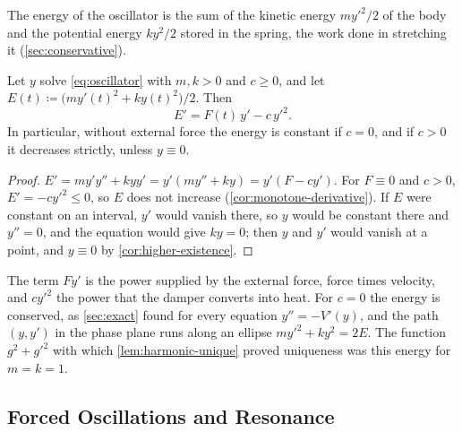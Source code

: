 The energy of the oscillator is the sum of the kinetic energy $my'^2/2$ of the body and the potential energy $ky^2/2$ stored in the spring, the work done in stretching it (\cref{sec:conservative}).

\begin{proposition}
\label{prop:oscillator-energy}
Let $y$ solve \eqref{eq:oscillator} with $m,k>0$ and $c\ge0$, and let $E(t)\coloneqq\bigl(my'(t)^2+ky(t)^2\bigr)/2$. Then
\[
E'=F(t)\,y'-c\,y'^2 .
\]
In particular, without external force the energy is constant if $c=0$, and if $c>0$ it decreases strictly, unless $y\equiv0$.
\end{proposition}

\begin{proof}
$E'=my'y''+kyy'=y'(my''+ky)=y'(F-cy')$. For $F\equiv0$ and $c>0$, $E'=-cy'^2\le0$, so $E$ does not increase (\cref{cor:monotone-derivative}). If $E$ were constant on an interval, $y'$ would vanish there, so $y$ would be constant there and $y''=0$, and the equation would give $ky=0$; then $y$ and $y'$ would vanish at a point, and $y\equiv0$ by \cref{cor:higher-existence}.
\end{proof}

The term $Fy'$ is the power supplied by the external force, force times velocity, and $cy'^2$ the power that the damper converts into heat. For $c=0$ the energy is conserved, as \cref{sec:exact} found for every equation $y''=-V'(y)$, and the path $(y,y')$ in the phase plane runs along an ellipse $my'^2+ky^2=2E$. The function $g^2+g'^2$ with which \cref{lem:harmonic-unique} proved uniqueness was this energy for $m=k=1$.

\subsection{Forced Oscillations and Resonance}


